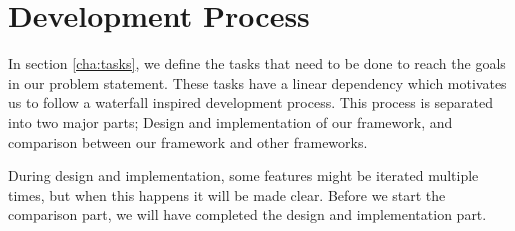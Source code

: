\section{Development Process}\label{cha:developmentProcess}
In section \ref{cha:tasks}, we define the tasks that need to be done to reach the goals in our problem statement. These tasks have a linear dependency which motivates us to follow a waterfall inspired development process. This process is separated into two major parts; Design and implementation of our framework, and comparison between our framework and other frameworks. 

During design and implementation, some features might be iterated multiple times, but when this happens it will be made clear. Before we start the comparison part, we will have completed the design and implementation part.

